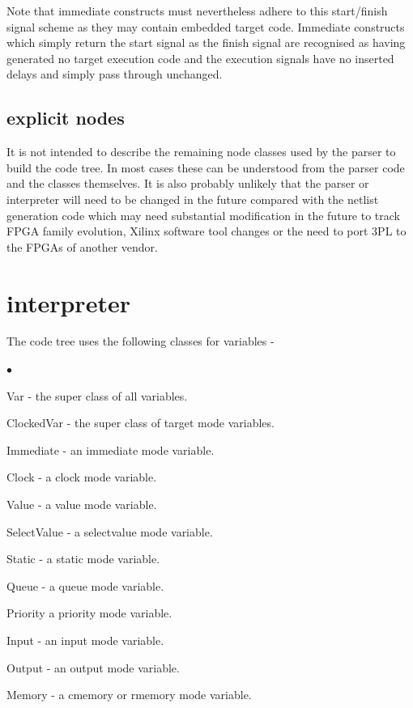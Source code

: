\documentclass[10pt,a4paper,twoside,fleqn]{book}
\newcommand{\blist}{\begin{list}{$\bullet$}{\setlength{\itemsep}{-5pt}\setlength{\topsep}{-5pt}}}
\newcommand{\blend}{\end{list}}
\begin{document}
            Note that immediate constructs must nevertheless adhere to this
            start/finish signal scheme as they may contain embedded target code.
            Immediate constructs which simply return the start signal as the finish
            signal are recognised as having generated no target execution code and
            the execution signals have no inserted delays and simply pass through
            unchanged.

        \subsection{explicit nodes}
        
            It is not intended to describe the remaining node classes used by the
            parser to build the code tree. In most cases these can be understood
            from the parser code and the classes themselves. It is also probably
            unlikely that the parser or interpreter will need to be changed in the
            future compared with the netlist generation code which may need
            substantial modification in the future to track FPGA family evolution,
            Xilinx software tool changes or the need to port 3PL to the FPGAs of
            another vendor.







    \section{interpreter}
    



        The code tree uses the following classes for variables -
               
        \blist
        \item Var - the super class of all variables.
        \item ClockedVar - the super class of target mode variables.
        \item Immediate - an immediate mode variable.
        \item Clock - a clock mode variable.
        \item Value - a value mode variable.
        \item SelectValue - a selectvalue mode variable.
        \item Static - a static mode variable.
        \item Queue - a queue  mode variable.
        \item Priority a priority mode variable.
        \item Input - an input mode variable.
        \item Output - an output mode variable.
        \item Memory - a cmemory or rmemory mode variable.
        \blend
        
\end{document}

